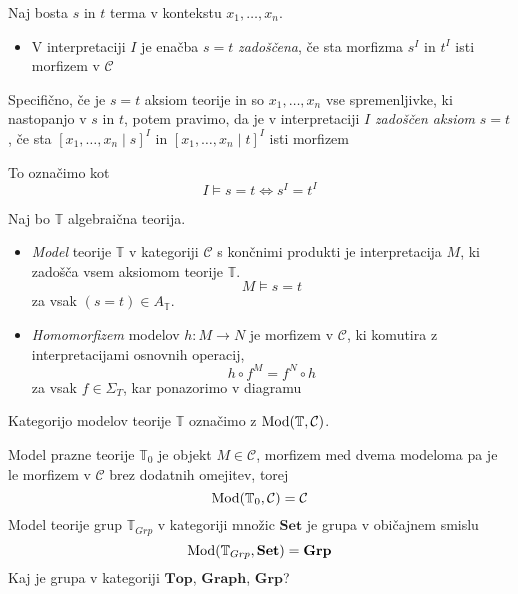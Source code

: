 \documentclass[../kategoricna_logika.tex]{subfiles}
\begin{document}
\begin{definicija}
Naj bosta $s$ in $t$ terma v kontekstu $x_1, \ldots, x_n$. 
\begin{itemize}
\item V interpretaciji $I$ je enačba $s = t$ \emph{zadoščena}, če sta morfizma $s^I$ in $t^I$ isti morfizem v $\mathcal{C}$
\end{itemize}
%
Specifično, če je $s = t$ aksiom teorije in so $x_1, \ldots, x_n$ vse spremenljivke, ki nastopanjo v $s$ in $t$, potem pravimo, da je v interpretaciji $I$ \emph{zadoščen aksiom} $s = t$, če sta $[x_1, \ldots, x_n \mid s]^I$ in $[x_1, \ldots, x_n \mid t]^I$ isti morfizem
\begin{center}
\end{center}
%
To označimo kot
$$I \models s = t \Longleftrightarrow s^I = t^I$$
\end{definicija}
%
\begin{definicija}
Naj bo $\mathbb{T}$ algebraična teorija. 
\begin{itemize}
%
\item \emph{Model} teorije $\mathbb{T}$ v kategoriji $\mathcal{C}$ s končnimi produkti je interpretacija $M$, ki zadošča vsem aksiomom teorije $\mathbb{T}$.
$$M \models s = t$$ za vsak $(s = t) \in A_\mathbb{T}$.
\end{itemize}
\end{definicija}
%
\begin{definicija}
\begin{itemize}
\item \emph{Homomorfizem} modelov $h : M \to N$ je morfizem v $\mathcal{C}$, ki komutira z interpretacijami osnovnih operacij,
$$h \circ f^M = f^N \circ h$$
za vsak $f \in \Sigma_T$, kar ponazorimo v diagramu
\begin{center}
\end{center}
\end{itemize}
\end{definicija}
%
Kategorijo modelov teorije $\mathbb{T}$ označimo z $\operatorname{Mod}(\mathbb{T}, \mathcal{C})$.
%
\begin{primer}
Model prazne teorije $\mathbb{T}_0$ je objekt $M \in \mathcal{C}$, morfizem med dvema modeloma pa je le morfizem v $\mathcal{C}$ brez dodatnih omejitev, torej
$$\operatorname{Mod}(\mathbb{T}_0, \mathcal{C}) = \mathcal{C}$$
%
Model teorije grup $\mathbb{T}_{Grp}$ v kategoriji množic $\mathbf{Set}$ je grupa v običajnem smislu
$$\operatorname{Mod}(\mathbb{T}_{Grp}, \mathbf{Set}) = \mathbf{Grp}$$
%
Kaj je grupa v kategoriji $\mathbf{Top}$, $\mathbf{Graph}$, $\mathbf{Grp}$?
\end{primer}
\end{document}
